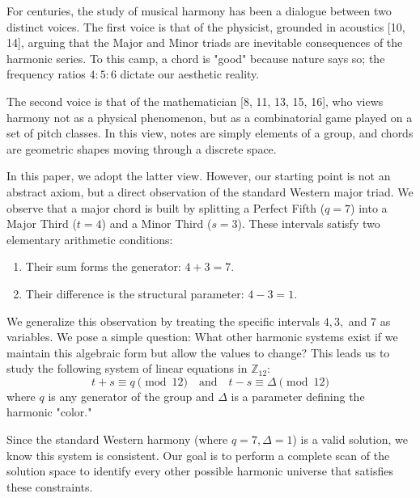 \documentclass[12pt,letterpaper]{amsart}
\begin{document}
For centuries, the study of musical harmony has been a dialogue between two distinct voices. The first voice is that of the physicist, grounded in acoustics [10, 14], arguing that the Major and Minor triads are inevitable consequences of the harmonic series. To this camp, a chord is "good" because nature says so; the frequency ratios $4:5:6$ dictate our aesthetic reality.

The second voice is that of the mathematician [8, 11, 13, 15, 16], who views harmony not as a physical phenomenon, but as a combinatorial game played on a set of pitch classes. In this view, notes are simply elements of a group, and chords are geometric shapes moving through a discrete space.

In this paper, we adopt the latter view. However, our starting point is not an abstract axiom, but a direct observation of the standard Western major triad. We observe that a major chord is built by splitting a Perfect Fifth ($q=7$) into a Major Third ($t=4$) and a Minor Third ($s=3$). These intervals satisfy two elementary arithmetic conditions:
\begin{enumerate}
    \item Their sum forms the generator: $4+3 = 7$.
    \item Their difference is the structural parameter: $4-3 = 1$.
\end{enumerate}

We generalize this observation by treating the specific intervals $4, 3,$ and $7$ as variables. We pose a simple question: What other harmonic systems exist if we maintain this algebraic form but allow the values to change? This leads us to study the following system of linear equations in $\mathbb{Z}_{12}$:
\begin{equation}
\label{eq:fundamental}
t+s \equiv q \pmod{12} \quad \text{and} \quad t-s \equiv \Delta \pmod{12}
\end{equation}
where $q$ is any generator of the group and $\Delta$ is a parameter defining the harmonic "color."

Since the standard Western harmony (where $q=7, \Delta=1$) is a valid solution, we know this system is consistent. Our goal is to perform a complete scan of the solution space to identify every other possible harmonic universe that satisfies these constraints.
\end{document}
